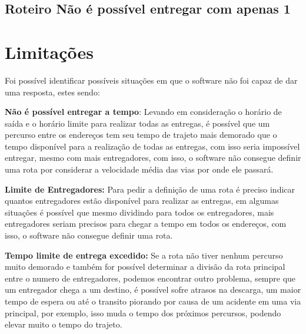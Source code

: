 \subsection{Roteiro Não é possível entregar com apenas 1}
\begin{center}
	\label{fig:RoteiroNaoepossivelentregarcomapenas1}
\end{center}


\section{Limitações}
Foi possível identificar possíveis situações em que o software não foi capaz de dar uma resposta, estes sendo:

\textbf{Não é possível entregar a tempo}: Levando em consideração o horário de saída e o horário limite para realizar todas as entregas, é possível que um percurso entre os endereços tem seu tempo de trajeto mais demorado que o tempo disponível para a realização de todas as entregas, com isso seria impossível entregar, mesmo com mais entregadores, com isso, o software não consegue definir uma rota por considerar a velocidade média das vias por onde ele passará.

\textbf{Limite de Entregadores:} Para pedir a definição de uma rota é preciso indicar quantos entregadores estão disponível para realizar as entregas, em algumas situações é possível que mesmo dividindo para todos os entregadores, mais entregadores seriam precisos para chegar a tempo em todos os endereços, com isso, o software não consegue definir uma rota.

\textbf{Tempo limite de entrega excedido:} Se a rota não tiver nenhum percurso muito demorado e também for possível determinar a divisão da rota principal entre o numero de entregadores, podemos encontrar outro problema, sempre que um entregador chega a um destino, é possível sofre atrasos na descarga, um maior tempo de espera ou até o transito piorando por causa de um acidente em uma via principal, por exemplo, isso muda o tempo dos próximos percursos, podendo elevar muito o tempo do trajeto.

